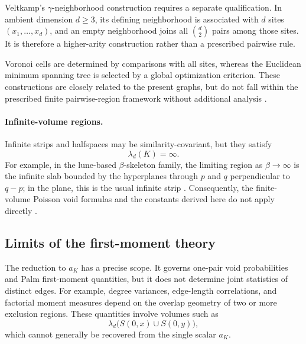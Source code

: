\documentclass[a4paper,fleqn]{cas-dc}
\numberwithin{equation}{section}
\newcommand{\1}{\mathds{1}}
\newcommand{\0}{\mathbf{0}}
\begin{document}
Veltkamp's $\gamma$-neighborhood construction requires a separate qualification. In ambient dimension $d \geq 3$, its defining neighborhood is associated with $d$ sites $(x_1, \ldots, x_d)$, and an empty neighborhood joins all $\binom{d}{2}$ pairs among those sites. It is therefore a higher-arity construction rather than a prescribed pairwise rule.

Voronoi cells are determined by comparisons with all sites, whereas the Euclidean minimum spanning tree is selected by a global optimization criterion. These constructions are closely related to the present graphs, but do not fall within the prescribed finite pairwise-region framework without additional analysis \citep{devroye1988expected,toussaint1980relative,jaromczyk1992relative,veltkamp1992gamma,penrose2001central}.

\paragraph{Infinite-volume regions.}
Infinite strips and halfspaces may be similarity-covariant, but they satisfy
\begin{equation}\label{eq:infinite-region-volume-limit}
\lambda_d(K) = \infty.
\end{equation}
For example, in the lune-based $\beta$-skeleton family, the limiting region as $\beta \to \infty$ is the infinite slab bounded by the hyperplanes through $p$ and $q$ perpendicular to $q-p$; in the plane, this is the usual infinite strip \citep{cardinal2009empty}. Consequently, the finite-volume Poisson void formulas and the constants derived here do not apply directly \citep{devroye1988expected,veltkamp1992gamma}.


\subsection{Limits of the first-moment theory}
The reduction to $a_K$ has a precise scope. It governs one-pair void probabilities and Palm first-moment quantities, but it does not determine joint statistics of distinct edges. For example, degree variances, edge-length correlations, and factorial moment measures depend on the overlap geometry of two or more exclusion regions. These quantities involve volumes such as
\begin{equation}\label{eq:exclusion-region-overlap}
\lambda_d\bigl(S(0,x)\cup S(0,y)\bigr),
\end{equation}
which cannot generally be recovered from the single scalar $a_K$.
\end{document}
